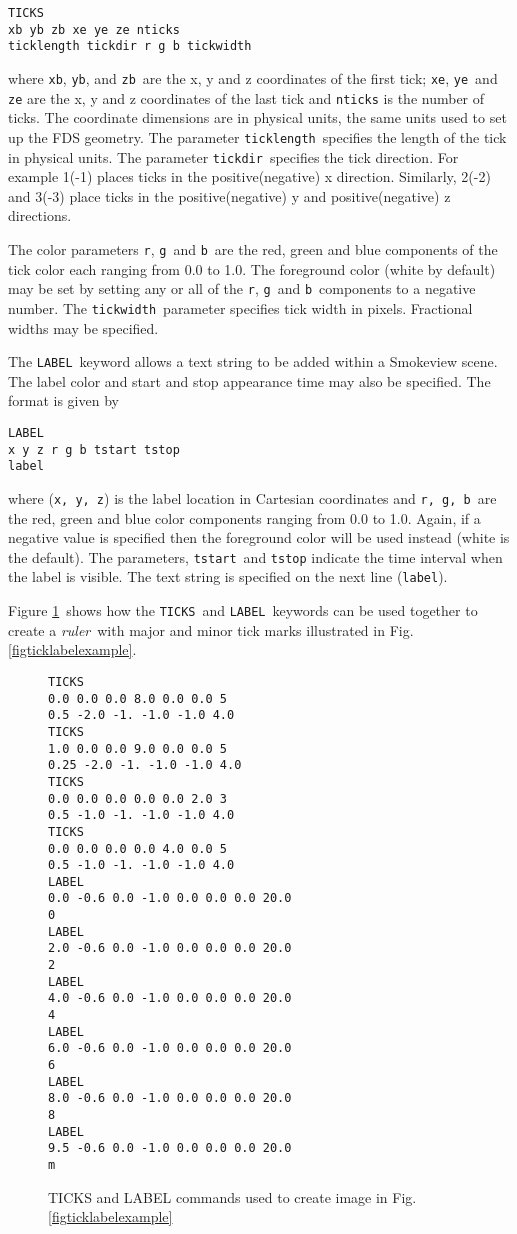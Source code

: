 \documentclass[11pt,twoside]{book}
\begin{document}
\begin{lstlisting}
TICKS
xb yb zb xe ye ze nticks
ticklength tickdir r g b tickwidth
\end{lstlisting}

\noindent where {\tt xb}, {\tt yb}, and {\tt zb}\ are the x, y and
z coordinates of the first tick; {\tt xe}, {\tt ye}\ and {\tt ze}
are the x, y and z coordinates of the last tick and {\tt nticks}
is the number of ticks. The coordinate dimensions are in physical
units, the same units used to set up the FDS geometry. The
parameter {\tt ticklength}\ specifies the length of the tick in
physical units. The parameter {\tt tickdir}\ specifies the tick
direction.  For example 1(-1) places ticks in the
positive(negative) x direction. Similarly, 2(-2) and 3(-3) place
ticks in the positive(negative) y and positive(negative) z
directions.

The color parameters {\tt r}, {\tt g}\ and {\tt b}\ are the
red, green and blue components of the tick color each
ranging from 0.0 to 1.0. The foreground color (white by
default) may be set by setting any or all of the {\tt r},
{\tt g}\ and {\tt b}\ components to a negative number. The
{\tt tickwidth}\ parameter specifies tick width in pixels.
Fractional widths may be specified.

The {\tt LABEL}\ keyword allows a text string to be added
within a Smokeview scene.  The label color and start and
stop appearance time may also be specified. The format is
given by

\begin{lstlisting}
LABEL
x y z r g b tstart tstop
label
\end{lstlisting}

\noindent where ({\tt x, y, z}) is the label location in Cartesian
coordinates and {\tt r, g, b}\ are the red, green and blue color
components ranging from 0.0 to 1.0.  Again, if a negative value is
specified then the foreground color will be used instead (white is
the default).  The parameters, {\tt tstart}\ and {\tt tstop}
indicate the time interval when the label is visible. The text
string is specified on the next line ({\tt label}).

Figure \ref{figticklabels}\ shows how the {\tt TICKS}\ and
{\tt LABEL}\ keywords can be used together to create a
{\em ruler}\ with major and minor tick marks illustrated in Fig.
\ref{figticklabelexample}.

\begin{figure}[bph]
{\small
\begin{lstlisting}
TICKS
0.0 0.0 0.0 8.0 0.0 0.0 5
0.5 -2.0 -1. -1.0 -1.0 4.0
TICKS
1.0 0.0 0.0 9.0 0.0 0.0 5
0.25 -2.0 -1. -1.0 -1.0 4.0
TICKS
0.0 0.0 0.0 0.0 0.0 2.0 3
0.5 -1.0 -1. -1.0 -1.0 4.0
TICKS
0.0 0.0 0.0 0.0 4.0 0.0 5
0.5 -1.0 -1. -1.0 -1.0 4.0
LABEL
0.0 -0.6 0.0 -1.0 0.0 0.0 0.0 20.0
0
LABEL
2.0 -0.6 0.0 -1.0 0.0 0.0 0.0 20.0
2
LABEL
4.0 -0.6 0.0 -1.0 0.0 0.0 0.0 20.0
4
LABEL
6.0 -0.6 0.0 -1.0 0.0 0.0 0.0 20.0
6
LABEL
8.0 -0.6 0.0 -1.0 0.0 0.0 0.0 20.0
8
LABEL
9.5 -0.6 0.0 -1.0 0.0 0.0 0.0 20.0
m
\end{lstlisting}
}
\caption{ TICKS and LABEL commands used to create image in Fig. \ref{figticklabelexample}}
\label{figticklabels}%
\end{figure}
\end{document}
